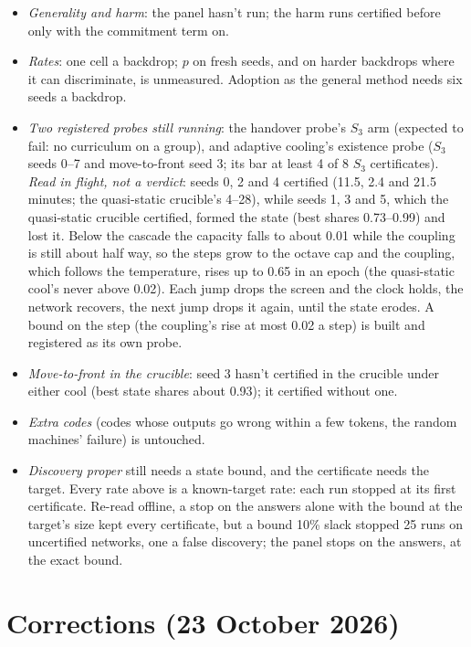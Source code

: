 \documentclass[11pt]{article}
\begin{document}
\begin{itemize}
  \item \emph{Generality and harm}: the panel hasn't run; the harm runs certified before only with
  the commitment term on.
  \item \emph{Rates}: one cell a backdrop; $p$ on fresh seeds, and on harder backdrops where it can
  discriminate, is unmeasured. Adoption as the general method needs six seeds a backdrop.
  \item \emph{Two registered probes still running}: the handover probe's $S_3$ arm (expected to fail:
  no curriculum on a group), and adaptive cooling's existence probe ($S_3$ seeds 0--7 and
  move-to-front seed 3; its bar at least 4 of 8 $S_3$ certificates). \emph{Read in flight, not a
  verdict}: seeds 0, 2 and 4 certified (11.5, 2.4 and 21.5 minutes; the quasi-static crucible's 4--28),
  while seeds 1, 3 and 5, which the quasi-static crucible certified, formed the state (best shares
  0.73--0.99) and lost it. Below the cascade the capacity falls to about 0.01 while the coupling is
  still about half way, so the steps grow to the octave cap and the coupling, which follows the
  temperature, rises up to 0.65 in an epoch (the quasi-static cool's never above 0.02). Each jump drops
  the screen and the clock holds, the network recovers, the next jump drops it again, until the state
  erodes. A bound on the step (the coupling's rise at most 0.02 a step) is built and registered as
  its own probe.
  \item \emph{Move-to-front in the crucible}: seed 3 hasn't certified in the crucible under either
  cool (best state shares about 0.93); it certified without one.
  \item \emph{Extra codes} (codes whose outputs go wrong within a few tokens, the random machines'
  failure) is untouched.
  \item \emph{Discovery proper} still needs a state bound, and the certificate needs the target. Every
  rate above is a known-target rate: each run stopped at its first certificate. Re-read offline, a
  stop on the answers alone with the bound at the target's size kept every certificate, but a bound
  10\% slack stopped 25 runs on uncertified networks, one a false discovery; the panel stops on the answers, at the exact bound.
\end{itemize}

\section{Corrections (23 October 2026)}
\label{sec:corrections}
\end{document}
